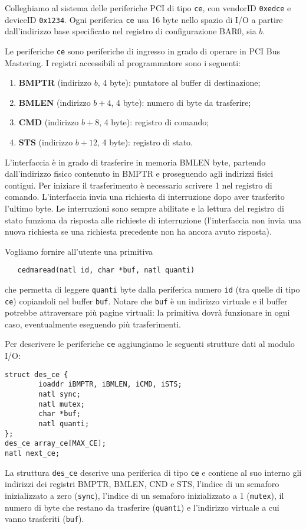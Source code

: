 Colleghiamo al sistema delle periferiche PCI di tipo \verb|ce|, con vendorID \verb|0xedce| e deviceID \verb|0x1234|.
Ogni periferica \verb|ce| usa 16 byte nello spazio di I/O a partire dall'indirizzo base specificato nel
registro di configurazione BAR0, sia $b$.

Le periferiche \verb|ce| sono periferiche di ingresso in grado di operare in PCI Bus Mastering.
I registri accessibili al programmatore sono i seguenti:
\begin{enumerate}
  \item {\bf BMPTR} (indirizzo $b$, 4 byte): puntatore al buffer di destinazione;
  \item {\bf BMLEN} (indirizzo $b+4$, 4 byte): numero di byte da trasferire;
  \item {\bf CMD} (indirizzo $b+8$, 4 byte): registro di comando;
  \item {\bf STS} (indirizzo $b+12$, 4 byte): registro di stato.
\end{enumerate}
L'interfaccia \`e in grado di trasferire in memoria BMLEN byte, partendo dall'indirizzo fisico contenuto
in BMPTR e proseguendo agli indirizzi fisici contigui. Per iniziare il trasferimento \`e necessario scrivere 1 nel registro di comando.
L'interfaccia invia una richiesta di interruzione dopo aver trasferito l'ultimo byte.
Le interruzioni sono sempre abilitate e la lettura del registro di stato funziona da risposta alle richieste di interruzione
(l'interfaccia non invia una nuova richiesta se una richiesta precedente non ha ancora avuto risposta).

Vogliamo fornire all'utente una primitiva 
\begin{verbatim}
   cedmaread(natl id, char *buf, natl quanti)
\end{verbatim}
che permetta di leggere \verb|quanti| byte dalla periferica numero \verb|id| (tra quelle di tipo \verb|ce|) copiandoli
nel buffer \verb|buf|. Notare che \verb|buf| \`e un indirizzo virtuale e il buffer potrebbe attraversare pi\`u
pagine virtuali: la primitiva dovr\`a funzionare in ogni caso, eventualmente eseguendo pi\`u trasferimenti.

Per descrivere le periferiche \verb|ce| aggiungiamo le seguenti strutture dati al modulo I/O:
\begin{verbatim}
struct des_ce {
        ioaddr iBMPTR, iBMLEN, iCMD, iSTS;
        natl sync;
        natl mutex;
        char *buf;
        natl quanti;
};
des_ce array_ce[MAX_CE];
natl next_ce;
\end{verbatim}
La struttura \verb|des_ce| descrive una periferica di tipo \verb|ce| e contiene al suo interno gli indirizzi
dei registri BMPTR, BMLEN, CND e STS, l'indice di un semaforo inizializzato a zero (\verb|sync|), l'indice di un semaforo
inizializzato a 1 (\verb|mutex|), il numero di byte che restano da trasferire (\verb|quanti|) e l'indirizzo virtuale
a cui vanno trasferiti (\verb|buf|).

